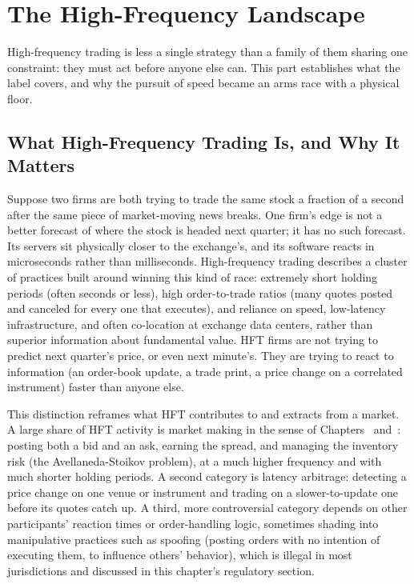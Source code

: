 \documentclass[../ai_in_finance]{subfiles}
\begin{document}
\section{The High-Frequency Landscape}

High-frequency trading is less a single strategy than a family of them sharing one constraint: they must act before anyone else can. This part establishes what the label covers, and why the pursuit of speed became an arms race with a physical floor.

\subsection{What High-Frequency Trading Is, and Why It Matters}

Suppose two firms are both trying to trade the same stock a fraction of a second after the same piece of market-moving news breaks. One firm's edge is not a better forecast of where the stock is headed next quarter; it has no such forecast. Its servers sit physically closer to the exchange's, and its software reacts in microseconds rather than milliseconds. High-frequency trading describes a cluster of practices built around winning this kind of race: extremely short holding periods (often seconds or less), high order-to-trade ratios (many quotes posted and canceled for every one that executes), and reliance on speed, low-latency infrastructure, and often co-location at exchange data centers, rather than superior information about fundamental value. HFT firms are not trying to predict next quarter's price, or even next minute's. They are trying to react to information (an order-book update, a trade print, a price change on a correlated instrument) faster than anyone else.

This distinction reframes what HFT contributes to and extracts from a market. A large share of HFT activity is market making in the sense of Chapters~ and~: posting both a bid and an ask, earning the spread, and managing the inventory risk (the Avellaneda-Stoikov problem), at a much higher frequency and with much shorter holding periods. A second category is latency arbitrage: detecting a price change on one venue or instrument and trading on a slower-to-update one before its quotes catch up. A third, more controversial category depends on other participants' reaction times or order-handling logic, sometimes shading into manipulative practices such as spoofing (posting orders with no intention of executing them, to influence others' behavior), which is illegal in most jurisdictions and discussed in this chapter's regulatory section.
\end{document}
